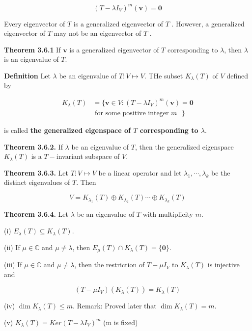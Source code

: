 \documentclass[10pt,landscape]{article}
\begin{document}
\begin{multicols}{4}
$$
(T - \lambda I_V)^m (\mathbf{v}) = \mathbf{0}
$$

Every eigenvector of $T$ is a generalized eigenvector of $T$ . However, a generalized eigenvector of $T$ may not be an eigenvector of $T$ .

\textbf{Theorem 3.6.1} If $\mathbf{v}$ is a generalized eigenvector of $T$ corresponding to $\lambda$, then $\lambda$ is an eigenvalue of $T$.

\textbf{Definition} Let $\lambda$ be an eigenvalue of $T: V \mapsto V$. THe subset $K_{\lambda}(T)$ of $V$ defined by

$$
\begin{aligned}
K_{\lambda}(T) &= \{ \mathbf{v} \in V: (T - \lambda I_V)^m (\mathbf{v}) = \mathbf{0} \\ 
&\text{ for some positive integer $m$ }   \}
\end{aligned}
$$

is called \textbf{the generalized eigenspace of $T$ corresponding to $\lambda$}.

\textbf{Theorem 3.6.2.} If $\lambda$ be an eigenvalue of $T$, then the generalized eigenspace $K_{\lambda}(T)$ is a $T-$invariant subspace of $V$.

\textbf{Theorem 3.6.3.} Let $T: V \mapsto V$ be a linear operator and let $\lambda_1, \cdots, \lambda_k$ be the distinct eigenvalues of $T$. Then

$$
V = K_{\lambda_1}(T) \oplus K_{\lambda_2}(T) \cdots \oplus K_{\lambda_k}(T)
$$

\textbf{Theorem 3.6.4.} Let $\lambda$ be an eigenvalue of $T$ with multiplicity $m$.

(i) $E_{\lambda}(T) \subseteq K_{\lambda}(T)$.

(ii) If $\mu \in \mathbb{C}$ and $\mu \neq \lambda$, then $E_{\mu} (T) \cap K_{\lambda}(T) = \{ \mathbf{0} \}$.

(iii) If $\mu \in \mathbb{C}$ and $\mu \neq \lambda$, then the restriction of $T - \mu I_V$ to $K_{\lambda}(T)$ is injective and

$$
(T - \mu I_V)(K_{\lambda}(T)) = K_{\lambda}(T)
$$

(iv) $\dim K_{\lambda}(T) \leq m$. Remark: Proved later that $\dim K_{\lambda}(T) = m$.

(v) $K_{\lambda}(T) = Ker(T - \lambda I_V)^m$ (m is fixed)



\end{multicols}
\end{document}
